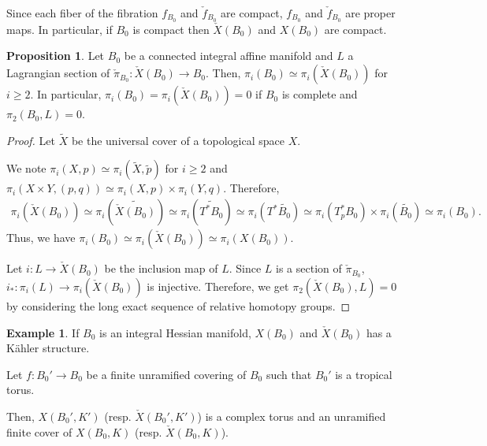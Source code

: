 \documentclass[a4paper,dvipdfmx,reqno,12pt]{amsart}
\theoremstyle{definition}
\newtheorem{example}[theorem]{Example}
\newtheorem{proposition}[theorem]{Proposition}
\numberwithin{equation}{section}
\begin{document}
Since each fiber of the fibration $f_{B_0}$ and 
$\check{f}_{B_0}$ are compact,
$f_{B_0}$ and $\check{f}_{B_0}$ are proper maps.
In particular, if $B_0$ is compact then 
$\check{X}(B_0)$ and $X(B_0)$ are compact.

\begin{proposition}

\label{proposition-unobstructed-lagrangian}
Let $B_0$ be a connected integral affine manifold 
and $L$ a Lagrangian section of 
$\check{\pi}_{B_0}\colon \check{X}(B_0)\to B_0$. 
Then, $\pi_i(B_0)\simeq \pi_i(\check{X}(B_0))$ 
for $i\geq 2$.
In particular, 
$\pi_i(B_0)=\pi_i(\check{X}(B_0))=0$ if 
$B_0$ is complete and $\pi_2(B_0,L)=0$.
\end{proposition}
\begin{proof}
Let $\widetilde{X}$ be the universal cover of 
a topological space $X$.


We note $\pi_{i}(X,p)\simeq 
\pi_{i}(\widetilde{X},\tilde{p})$ for $i\geq 2$ and 
$\pi_{i}(X\times Y,(p,q))\simeq \pi_i(X,p)
\times \pi_i(Y,q)$. Therefore,
\begin{align}
\pi_{i}(\check{X}(B_0))\simeq 
\pi_{i}(\widetilde{\check{X}(B_0)})\simeq 
\pi_{i}(\widetilde{T^{*}B_0})\simeq 
\pi_{i}(T^{*}\widetilde{B_0})\simeq 
\pi_{i}(T_p^* B_0)\times \pi_{i}(\widetilde{B_0})\simeq 
\pi_{i}(B_0).
\end{align}
Thus, we have 
$\pi_{i}(B_0)\simeq \pi_{i}(\check{X}(B_0))\simeq 
\pi_{i}(X(B_0))$. 

Let $i\colon L\to \check{X}(B_0)$ be the inclusion map of 
$L$.
Since $L$ is a section of 
$\check{\pi}_{B_0}$, 
$i_*\colon \pi_i(L)\to \pi_i(\check{X}(B_0))$ is 
injective. Therefore, we get 
$\pi_2(\check{X}(B_0),L)=0$ by considering the long exact
sequence of relative homotopy groups.
\end{proof}


\begin{example}
If $B_0$ is an integral Hessian manifold, 
$X(B_0)$ and $\check{X}(B_0)$ has a K\"ahler structure.

Let $f:B_0' \to B_0$ be a finite unramified covering of $B_0$ such that $B_0'$ is a tropical torus.

Then, $X(B_0',K')$ (resp. $\check{X}(B_0',K')$) 
is a complex torus and an unramified finite cover 
of $X(B_0,K)$ (resp. $\check{X}(B_0,K)$).
\end{example}






\printindex
\end{document}
